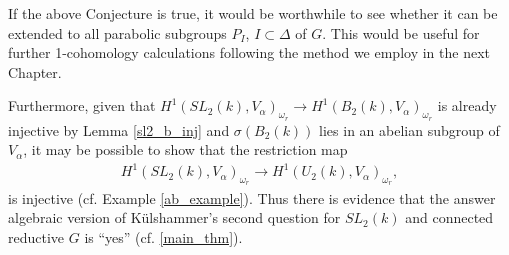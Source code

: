 If the above Conjecture is true, it would be worthwhile to see whether it can be extended to all parabolic subgroups $P_I$, $I\subset \Delta$ of $G$. This would be useful for further 1-cohomology calculations following the method we employ in the next Chapter.

Furthermore, given that $H^1(SL_2(k), V_\alpha)_{\omega_r}\rightarrow H^1(B_2(k), V_\alpha)_{\omega_r}$ is already injective by Lemma \ref{sl2_b_inj} and $\sigma\left(B_2(k)\right)$ lies in an abelian subgroup of $V_\alpha$, it may be possible to show that the restriction map
\begin{align*}
	H^1(SL_2(k), V_\alpha)_{\omega_r} \rightarrow H^1(U_2(k), V_\alpha)_{\omega_r},
\end{align*}
is injective (cf. Example \ref{ab_example}). Thus there is evidence that the answer algebraic version of K\"ulshammer's second question for $SL_2(k)$ and connected reductive $G$ is ``yes'' (cf. \ref{main_thm}).
